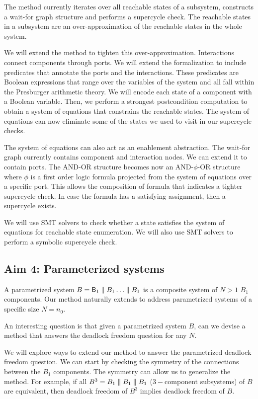 The method currently iterates over all reachable states of
a subsystem, constructs a wait-for graph structure and 
performs a supercycle check. 
The reachable states in a subsystem are an over-approximation
of the reachable states in the whole system. 

We will extend the method to tighten this over-approximation. 
Interactions connect components through ports. 
%
We will extend the formalization to include predicates 
that annotate the ports and the interactions. 
These predicates are Boolean expressions that range over the
variables of the system and all fall within 
the Presburger arithmetic theory. 
%
We will encode each state of a component with a Boolean 
variable.
Then, we perform a strongest postcondition computation to 
obtain a system of equations that constrains the reachable 
states.
%
The system of equations can now eliminate some of the states
we used to visit in our supercycle checks. 

The system of equations can also act as an enablement abstraction.
The wait-for graph currently contains component and interaction nodes. 
We can extend it to contain ports. 
The AND-OR structure becomes now an AND-$\phi$-OR structure
where $\phi$ is a first order logic formula projected from
the system of equations over a specific port. 
This allows the composition of formula that indicates
a tighter supercycle check. 
In case the formula has a satisfying assignment, then
a supercycle exists. 

We will use SMT solvers to check whether a state 
satisfies the system of equations for reachable state 
enumeration. 
We will also use SMT solvers to perform a symbolic
supercycle check.

\subsection{Aim 4: Parameterized systems} 

A parametrized system $B=\mathsf{B}_1 \parallel B_1 \ldots \parallel B_1$ is a 
composite system of $N>1$ $B_1$ components. 
Our method naturally extends to address parametrized systems 
of a specific size $N=n_0$. 

An interesting question is that given a parametrized system $B$, 
can we devise a method that answers the deadlock freedom
question for any $N$. 

We will explore ways to extend our method to answer the 
parametrized deadlock freedom question. 
We can start by checking the symmetry of the connections between
the $B_1$ components.
The symmetry can allow us to generalize the method. 
For example, if all $B^3=B_1\parallel B_1 \parallel B_1$ 
($3-$component subsystems) of $B$ are equivalent,
then deadlock freedom of $B^3$ implies deadlock freedom 
of $B$. 


